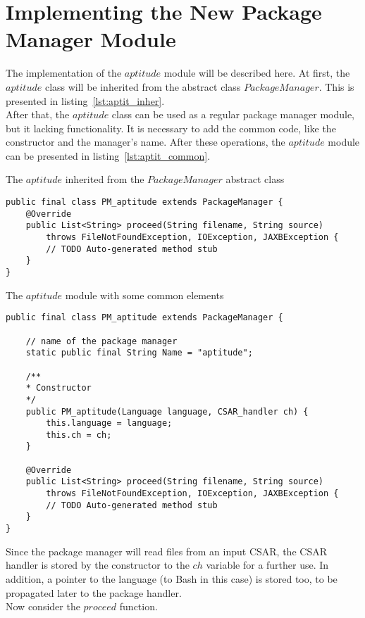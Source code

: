 \section{Implementing the New Package Manager Module}\label{sec:aptitude_imp}
The implementation of the $aptitude$ module will be described here.
At first, the $aptitude$ class will be inherited from the abstract class $PackageManager$. 
This is presented in listing~\ref{lst:aptit_inher}.\\
After that, the $aptitude$ class can be used as a regular package manager module, but it lacking functionality.
It is necessary to add the common code, like the constructor and the manager's name.
After these operations, the $aptitude$ module can be presented in listing~\ref{lst:aptit_common}.\\
\begin{Listing} 
	\caption{The $aptitude$ inherited from the $PackageManager$ abstract class}
	\label{lst:aptit_inher}
\begin{lstlisting}
public final class PM_aptitude extends PackageManager {
	@Override
	public List<String> proceed(String filename, String source)
		throws FileNotFoundException, IOException, JAXBException {
		// TODO Auto-generated method stub
	}
}
\end{lstlisting}
\end{Listing} 
\begin{Listing} 
\caption{The $aptitude$ module with some common elements}
\label{lst:aptit_common}
\begin{lstlisting}
public final class PM_aptitude extends PackageManager {

	// name of the package manager
	static public final String Name = "aptitude";
	
	/**
	* Constructor
	*/
	public PM_aptitude(Language language, CSAR_handler ch) {
		this.language = language;
		this.ch = ch;
	}
	
	@Override
	public List<String> proceed(String filename, String source)
		throws FileNotFoundException, IOException, JAXBException {
		// TODO Auto-generated method stub
	}
}
\end{lstlisting}
\end{Listing} 
Since the package manager will read files from an input CSAR, the CSAR handler is stored by the constructor to the $ch$ variable for a further use.
In addition, a pointer to the language (to Bash in this case) is stored too, to be propagated later to the package handler.\\
Now consider the $proceed$ function.
